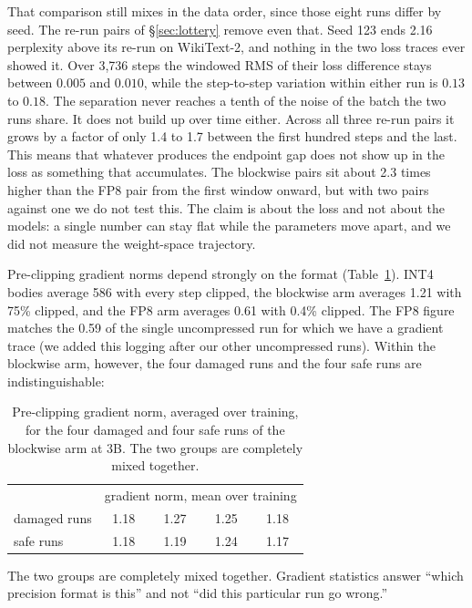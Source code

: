 \documentclass[11pt,letterpaper]{article}
\begin{document}
That comparison still mixes in the data order, since those eight runs differ by seed. The re-run pairs of \S\ref{sec:lottery} remove even that. Seed 123 ends 2.16 perplexity above its re-run on WikiText-2, and nothing in the two loss traces ever showed it. Over 3{,}736 steps the windowed RMS of their loss difference stays between $0.005$ and $0.010$, while the step-to-step variation within either run is $0.13$ to $0.18$. The separation never reaches a tenth of the noise of the batch the two runs share. It does not build up over time either. Across all three re-run pairs it grows by a factor of only 1.4 to 1.7 between the first hundred steps and the last. This means that whatever produces the endpoint gap does not show up in the loss as something that accumulates. The blockwise pairs sit about 2.3 times higher than the FP8 pair from the first window onward, but with two pairs against one we do not test this. The claim is about the loss and not about the models: a single number can stay flat while the parameters move apart, and we did not measure the weight-space trajectory.

Pre-clipping gradient norms depend strongly on the format (Table~\ref{tab:graddetect}). INT4 bodies average 586 with every step clipped, the blockwise arm averages 1.21 with 75\% clipped, and the FP8 arm averages 0.61 with 0.4\% clipped. The FP8 figure matches the 0.59 of the single uncompressed run for which we have a gradient trace (we added this logging after our other uncompressed runs). Within the blockwise arm, however, the four damaged runs and the four safe runs are indistinguishable: 

\begin{table}[htbp]
\centering
\caption{Pre-clipping gradient norm, averaged over training, for the four damaged and four safe runs of the blockwise arm at 3B. The two groups are completely mixed together.}
\label{tab:graddetect}
\begin{tabular}{lcccc}
\toprule
& \multicolumn{4}{c}{gradient norm, mean over training} \\
damaged runs & 1.18 & 1.27 & 1.25 & 1.18 \\
safe runs & 1.18 & 1.19 & 1.24 & 1.17 \\
\bottomrule
\end{tabular}
\end{table}

The two groups are completely mixed together. Gradient statistics answer ``which precision format is this'' and not ``did this particular run go wrong.''
\end{document}
